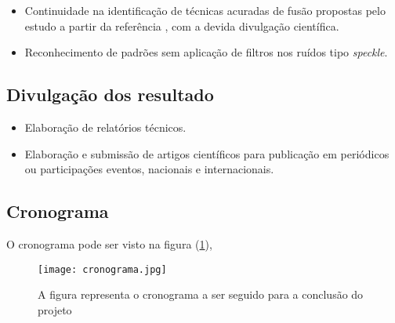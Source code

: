 \documentclass[runningheads]{llncs}
\begin{document}
\begin{itemize}
  \item Continuidade na identificação de técnicas acuradas de fusão propostas pelo estudo a partir da referência \cite{bmf_2020}, com a devida divulgação científica.
  \item Reconhecimento de padrões sem aplicação de filtros nos ruídos tipo \textit{speckle}.
\end{itemize}

\subsection{Divulgação dos resultado}

\begin{itemize}
  \item Elaboração de relatórios técnicos.
  \item Elaboração e submissão de artigos científicos para publicação em periódicos ou participações eventos, nacionais e internacionais.
\end{itemize}
\subsection{Cronograma}
O cronograma pode ser visto na figura (\ref{fig1}),
\begin{figure}[h!]
\begin{center}
\texttt{[image: cronograma.jpg]}
\end{center}
\caption{A figura representa o cronograma a ser seguido para a conclusão do projeto} \label{fig1}
\end{figure}
\end{document}
